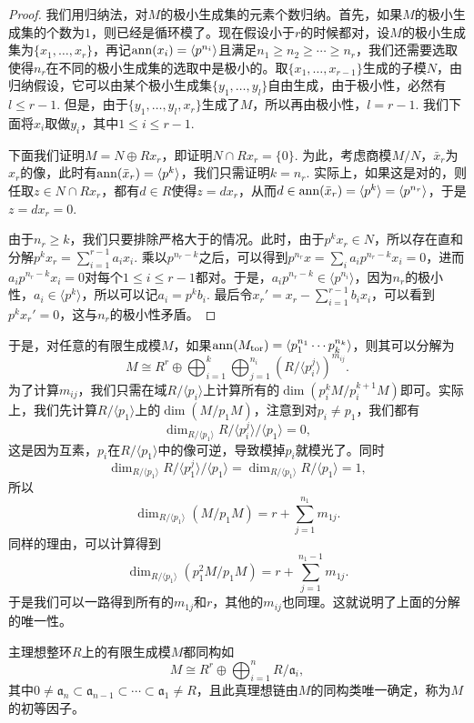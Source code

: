 \begin{proof}
我们用归纳法，对$M$的极小生成集的元素个数归纳。首先，如果$M$的极小生成集的个数为$1$，则已经是循环模了。现在假设小于$r$的时候都对，设$M$的极小生成集为$\{x_1,\dots,x_r\}$，再记$\operatorname{ann}(x_i)=\langle p^{n_i}\rangle$且满足$n_1\geq n_2\geq \cdots\geq n_r$，我们还需要选取使得$n_r$在不同的极小生成集的选取中是极小的。取$\{x_1,\dots,x_{r-1}\}$生成的子模$N$，由归纳假设，它可以由某个极小生成集$\{y_1,\dots,y_{l}\}$自由生成，由于极小性，必然有$l\leq r-1$. 但是，由于$\{y_1,\dots,y_{l},x_r\}$生成了$M$，所以再由极小性，$l=r-1$. 我们下面将$x_i$取做$y_i$，其中$1\leq i\leq r-1$.

下面我们证明$M=N\oplus Rx_r$，即证明$N\cap Rx_r=\{0\}$. 为此，考虑商模$M/N$，$\bar x_r$为$x_r$的像，此时有$\operatorname{ann}(\bar x_r)=\langle p^k\rangle$，我们只需证明$k=n_r$. 实际上，如果这是对的，则任取$z\in N\cap Rx_r$，都有$d\in R$使得$z=dx_r$，从而$d\in \operatorname{ann}(\bar x_r)=\langle p^k\rangle=\langle p^{n_r}\rangle$，于是$z=dx_r=0$. 

由于$n_r\geq k$，我们只要排除严格大于的情况。此时，由于$p^k x_r\in N$，所以存在直和分解$p^k x_r=\sum_{i=1}^{r-1} a_i x_i$. 乘以$p^{n_r-k}$之后，可以得到$p^{n_r}x=\sum_i a_ip^{n_r-k} x_i=0$，进而$a_ip^{n_r-k}x_i=0$对每个$1\leq i\leq r-1$都对。于是，$a_ip^{n_r-k}\in \langle p^{n_i}\rangle$，因为$n_r$的极小性，$a_i\in \langle p^k\rangle$，所以可以记$a_i=p^kb_i$. 最后令$x_r'=x_r-\sum_{i=1}^{r-1} b_ix_i$，可以看到$p^kx_{r}'=0$，这与$n_r$的极小性矛盾。
\end{proof}

于是，对任意的有限生成模$M$，如果$\operatorname{ann}(M_{\mathrm{tor}})=\langle p_1^{n_1}\cdots p_k^{n_k}\rangle$，则其可以分解为
\[
    M\cong R^r\oplus \bigoplus_{i=1}^k\bigoplus_{j=1}^{n_i} (R/\langle p_i^{j}\rangle)^{m_{ij}}.
\]
为了计算$m_{ij}$，我们只需在域$R/\langle p_i\rangle$上计算所有的$\dim (p_i^kM/p_i^{k+1}M)$即可。实际上，我们先计算$R/\langle p_1\rangle$上的$\dim (M/p_1M)$，注意到对$p_i\neq p_1$，我们都有
\[
    \dim_{R/\langle p_1\rangle}R/\langle p_i^{j}\rangle/\langle p_1\rangle=0,
\]
这是因为互素，$p_i$在$R/\langle p_1\rangle$中的像可逆，导致模掉$p_i$就模光了。同时
\[
    \dim_{R/\langle p_1\rangle}R/\langle p_1^{j}\rangle/\langle p_1\rangle=\dim_{R/\langle p_1\rangle}R/\langle p_1\rangle=1,
\]
所以
\[
    \dim_{R/\langle p_1\rangle}(M/p_1M)=r+\sum_{j=1}^{n_1}m_{1j}.
\]
同样的理由，可以计算得到
\[
    \dim_{R/\langle p_1\rangle}(p_1^2M/p_1M)=r+\sum_{j=1}^{n_1-1}m_{1j}.
\]
于是我们可以一路得到所有的$m_{1j}$和$r$，其他的$m_{ij}$也同理。这就说明了上面的分解的唯一性。

\begin{thm}
    主理想整环$R$上的有限生成模$M$都同构如
    \[
        M\cong R^r\oplus\bigoplus_{i=1}^n R/\mathfrak{a}_i,
    \]
    其中$0\neq \mathfrak{a}_n\subset \mathfrak{a}_{n-1}\subset \cdots\subset\mathfrak{a}_1\neq R$，且此真理想链由$M$的同构类唯一确定，称为$M$的初等因子。
\end{thm}

